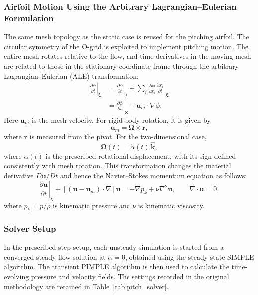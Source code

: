 \subsubsection{Airfoil Motion Using the Arbitrary Lagrangian--Eulerian Formulation}
The same mesh topology as the static case is reused for the pitching airfoil. The circular symmetry of the O-grid is exploited to implement pitching motion. The entire mesh rotates relative to the flow, and time derivatives in the moving mesh are related to those in the stationary coordinate frame through the arbitrary Lagrangian--Eulerian (ALE) transformation:
\begin{align}
\left.\frac{\partial\phi}{\partial t}\right|_{\boldsymbol\xi}
&=\left.\frac{\partial\phi}{\partial t}\right|_{\mathbf{x}}
+\sum_i\frac{\partial\phi}{\partial x_i}
\left.\frac{\partial x_i}{\partial t}\right|_{\boldsymbol\xi}\\
&=\left.\frac{\partial\phi}{\partial t}\right|_{\mathbf{x}}
+\mathbf{u}_m\cdot\nabla\phi.
\end{align}
Here $\mathbf{u}_m$ is the mesh velocity. For rigid-body rotation, it is given by
\begin{equation}
\mathbf{u}_m=\boldsymbol\Omega\times\mathbf{r},
\end{equation}
where $\mathbf{r}$ is measured from the pivot. For the two-dimensional case,
\begin{equation}
\boldsymbol\Omega(t)=\dot\alpha(t)\,\hat{\mathbf{k}},
\end{equation}
where $\alpha(t)$ is the prescribed rotational displacement, with its sign defined consistently with mesh rotation. This transformation changes the material derivative $D\mathbf{u}/Dt$ and hence the Navier--Stokes momentum equation as follows:
\begin{equation}
\left.\frac{\partial\mathbf{u}}{\partial t}\right|_{\boldsymbol\xi}
+[(\mathbf{u}-\mathbf{u}_m)\cdot\nabla]\mathbf{u}
=-\nabla p_k+\nu\nabla^2\mathbf{u},
\qquad \nabla\cdot\mathbf{u}=0,
\end{equation}
where $p_k=p/\rho$ is kinematic pressure and $\nu$ is kinematic viscosity.

\subsubsection{Solver Setup}
In the prescribed-step setup, each unsteady simulation is started from a converged steady-flow solution at $\alpha=0$, obtained using the steady-state SIMPLE algorithm. The transient PIMPLE algorithm is then used to calculate the time-evolving pressure and velocity fields. The settings recorded in the original methodology are retained in Table~\ref{tab:pitch_solver}.

